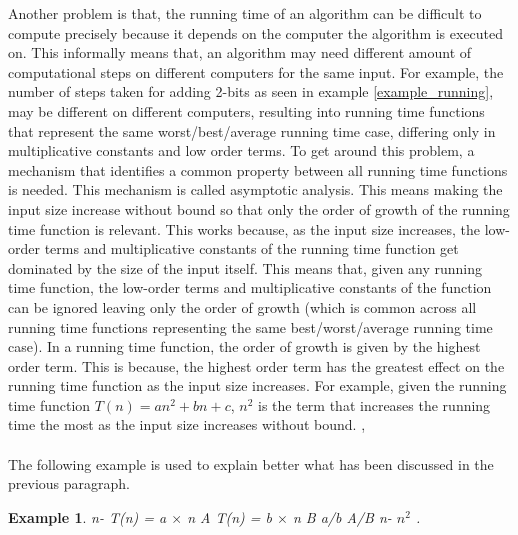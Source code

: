 \documentclass{article}
\newtheorem{example}[definition]{Example}
\begin{document}
Another problem is that, the running time of an algorithm can be difficult to compute precisely because it depends on the computer the algorithm is executed on. This informally means that, an algorithm may need different amount of computational steps on different computers for the same input. For example, the number of steps taken for adding 2-bits as seen in example \ref{example_running}, may be different on different computers, resulting into running time functions that represent the same worst/best/average running time case, differing only in multiplicative constants and low order terms. To get around this problem, a mechanism that identifies a common property between all running time functions is needed. This mechanism is called asymptotic analysis. This means making the input size increase without bound so that only the order of growth of the running time function is relevant. This works because, as the input size increases, the low-order terms and multiplicative constants of the running time function get dominated by the size of the input itself. This means that, given any running time function, the low-order terms and multiplicative constants of the function can be ignored leaving only the order of growth (which is common across all running time functions representing the same best/worst/average running time case). In a running time function, the order of growth is given by the highest order term. This is because, the highest order term has the greatest effect on the running time function as the input size increases. For example, given the running time function $\mathit{T(n) = an^2+bn+c}$, $\mathit{n^2}$ is the term that increases the running time the most as the input size increases without bound. \cite{cormen_leiserson_rivest_stein}, \cite{adamchik_2009} \\\\
The following example is used to explain better what has been discussed in the previous paragraph.
\begin{example}
{} n-{} T(n) = a $\times$ n {} A {} T(n) = b $\times$ n {} B {} a/b {} A/B {} n-{} $n^2$ {}. {}
\end{example}
\end{document}
